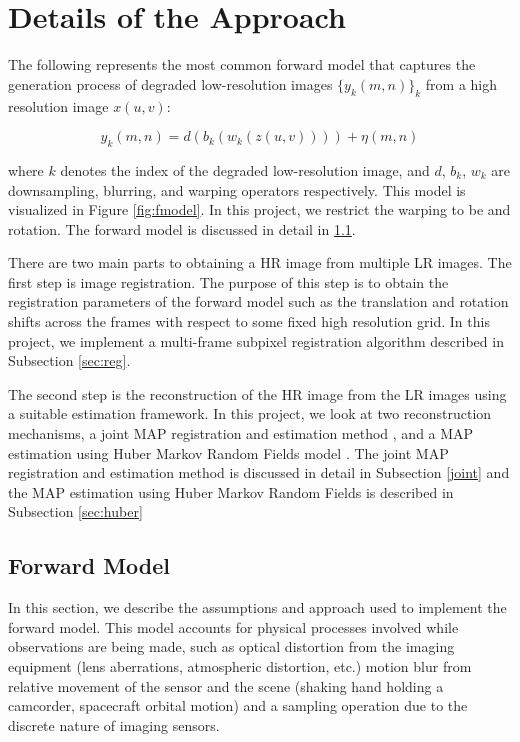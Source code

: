 \documentclass[10pt,twocolumn,letterpaper]{article}
\begin{document}
\section{Details of the Approach}

The following represents the most common forward model that captures the generation process of degraded low-resolution images $\lbrace y_k(m,n) \rbrace_k$ from a high resolution image $x(u,v)$:

$$y_k(m, n) = d(b_k(w_k(z(u, v)))) + \eta(m, n)$$

where $k$ denotes the index of the degraded low-resolution image, and $d$, $b_k$, $w_k$ are downsampling, blurring, and warping operators respectively. This model is visualized in Figure \ref{fig:fmodel}. In this project, we restrict the warping to be and rotation. The forward model is discussed in detail in \ref{sec:forward}.

There are two main parts to obtaining a HR image from multiple LR images. The first step is image registration. The purpose of this step is to obtain the registration parameters of the forward model such as the translation and rotation shifts across the frames with respect to some fixed high resolution grid. In this project, we implement a multi-frame subpixel registration algorithm described in Subsection \ref{sec:reg}. 

The second step is the reconstruction of the HR image from the 
LR images using a suitable estimation framework. In this project, we look at two reconstruction mechanisms, a joint MAP registration and estimation method \cite{hardie1997joint}, and a MAP estimation using Huber Markov Random Fields model \cite{schultz1996extraction}. The joint MAP registration and estimation method is discussed in detail in Subsection \ref{joint} and the MAP estimation using Huber Markov Random Fields is described in Subsection \ref{sec:huber}


\subsection{Forward Model}\label{sec:forward}

In this section, we describe the assumptions and approach used to implement the forward model.  This model accounts for physical processes involved while observations are being made, such as optical distortion from the imaging equipment (lens aberrations, atmospheric distortion, etc.) motion blur from relative movement of the sensor and the scene (shaking hand holding a camcorder, spacecraft orbital motion) and a sampling operation due to the discrete nature of imaging sensors.
\end{document}
